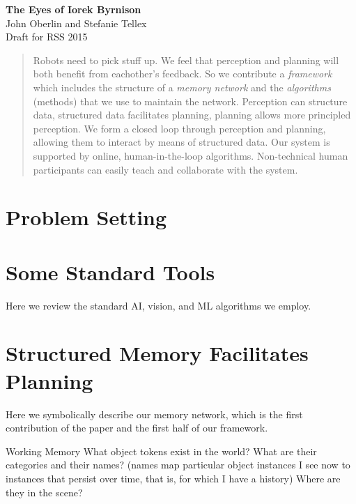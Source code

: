 \documentclass[12pt]{article}
\numberwithin{equation}{section}
\numberwithin{table}{section}
\numberwithin{figure}{section}
\begin{document}



\begin{center}
\textbf{\Large The Eyes of Iorek Byrnison}\\[6pt] 
John Oberlin and Stefanie Tellex\\
Draft for RSS 2015\\
\end{center}



\begin{abstract}
Robots need to pick stuff up.
%
We feel that perception and planning will both benefit from eachother's feedback.
%
So we contribute a \emph{framework} which includes the structure of
a \emph{memory network} and the \emph{algorithms} (methods) that we use
to maintain the network.
%
Perception can structure data, structured data facilitates planning, planning allows more principled perception.
%
We form a closed loop through perception and planning, allowing them to interact by means of structured data.
%
Our system is supported by online, human-in-the-loop algorithms. Non-technical human participants can easily
teach and collaborate with the system.
\end{abstract}


\section{Problem Setting}

\section{Some Standard Tools}
Here we review the standard AI, vision, and ML algorithms we employ.


\section{Structured Memory Facilitates Planning}
Here we symbolically describe our memory network,
which is the first contribution of the paper and
the first half of our framework.

Working Memory
  What object tokens exist in the world? 
  What are their categories and their names? 
    (names map particular object instances I see now to instances that persist over
     time, that is, for which I have a history)
  Where are they in the scene?
  
\end{document}
